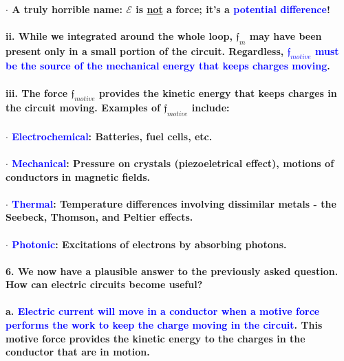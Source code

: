 \documentclass{article}
\begin{document}
\paragraph{\indent\indent $\cdot$ A truly horrible name: $\mathcal{E}$ is \underline{not} a force; it's a \textcolor{blue}{potential difference}!}
\paragraph{\indent\indent ii. While we integrated around the whole loop, $\boldsymbol{\mathfrak{f}}_m$ may have been present only in a small portion of the circuit. Regardless, \textcolor{blue}{$\boldsymbol{\mathfrak{f}}_{motive}$ must be the source of the mechanical energy that keeps charges moving}.}
\paragraph{\indent\indent iii. The force $\boldsymbol{\mathfrak{f}}_{motive}$ provides the kinetic energy that keeps charges in the circuit moving. Examples of $\boldsymbol{\mathfrak{f}}_{motive}$ include:}
\paragraph{\indent\indent $\cdot$ \textcolor{blue}{Electrochemical}: Batteries, fuel cells, etc.}
\paragraph{\indent\indent $\cdot$ \textcolor{blue}{Mechanical}: Pressure on crystals (piezoeletrical effect), motions of conductors in magnetic fields.}
\paragraph{\indent\indent $\cdot$ \textcolor{blue}{Thermal}: Temperature differences involving dissimilar metals - the Seebeck, Thomson, and Peltier effects.}
\paragraph{\indent\indent $\cdot$ \textcolor{blue}{Photonic}: Excitations of electrons by absorbing photons.}
\paragraph{6. We now have a plausible answer to the previously asked question. How can electric circuits become useful?}
\paragraph{\indent a. \textcolor{blue}{Electric current will move in a conductor when a motive force performs the work to keep the charge moving in the circuit}. This motive force provides the kinetic energy to the charges in the conductor that are in motion.}
\end{document}
